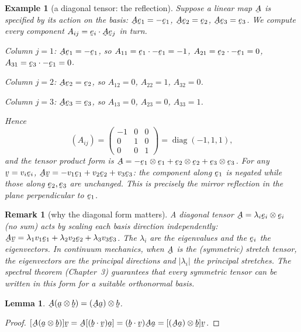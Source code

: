 \documentclass[17pt,a4paper]{extreport}
\DeclareRobustCommand{\vek}[1]{\underaccent{\tilde}{#1}}
\newcommand{\ba}{\vek{a}}
\newcommand{\bb}{\vek{b}}
\newcommand{\bv}{\vek{v}}
\newcommand{\be}{\vek{e}}
\newcommand{\bA}{\vek{A}}
\newcommand{\ip}[2]{#1\cdot#2}
\theoremstyle{scplain}
\newtheorem{lemma}[theorem]{Lemma}
\theoremstyle{scdefn}
\newtheorem{remark}[theorem]{Remark}
\newtheorem{example}[theorem]{Example}
\theoremstyle{scplain}
\begin{document}
\begin{example}[a diagonal tensor: the reflection]\label{ex:diag}
Suppose a linear map $\bA$ is specified by its action on the basis:
$\bA\be_{1}=-\be_{1}$, $\bA\be_{2}=\be_{2}$, $\bA\be_{3}=\be_{3}$.
We compute every component $A_{ij}=\ip{\be_{i}}{\bA\be_{j}}$ in turn.

\emph{Column $j=1$}: $\bA\be_{1}=-\be_{1}$, so
$A_{11}=\ip{\be_{1}}{-\be_{1}}=-1$,
$A_{21}=\ip{\be_{2}}{-\be_{1}}=0$,
$A_{31}=\ip{\be_{3}}{-\be_{1}}=0$.

\emph{Column $j=2$}: $\bA\be_{2}=\be_{2}$, so
$A_{12}=0$, $A_{22}=1$, $A_{32}=0$.

\emph{Column $j=3$}: $\bA\be_{3}=\be_{3}$, so
$A_{13}=0$, $A_{23}=0$, $A_{33}=1$.

Hence
\[
(A_{ij})=\begin{pmatrix}-1&0&0\\0&1&0\\0&0&1\end{pmatrix}
=\operatorname{diag}(-1,1,1),
\]
and the tensor product form is
$\bA=-\be_{1}\otimes\be_{1}+\be_{2}\otimes\be_{2}+\be_{3}\otimes\be_{3}$.
For any $\bv=v_i\be_i$,
$\bA\bv=-v_1\be_1+v_2\be_2+v_3\be_3$: the component along $\be_1$ is
negated while those along $\be_2,\be_3$ are unchanged. This is precisely
the \emph{mirror reflection} in the plane perpendicular to $\be_1$.
\end{example}

\begin{remark}[why the diagonal form matters]\label{rem:diag}
A diagonal tensor $\bA=\lambda_i\be_i\otimes\be_i$ (no sum) acts by
scaling each basis direction independently:
$\bA\bv=\lambda_1v_1\be_1+\lambda_2v_2\be_2+\lambda_3v_3\be_3$. The
$\lambda_i$ are the eigenvalues and the $\be_i$ the eigenvectors. In
continuum mechanics, when $\bA$ is the (symmetric) stretch tensor, the
eigenvectors are the principal directions and $|\lambda_i|$ the principal
stretches. The spectral theorem (Chapter~3) guarantees that every
symmetric tensor can be written in this form for a suitable orthonormal
basis.
\end{remark}

\begin{lemma}\label{lem:Aab}
$\bA(\ba\otimes\bb)=(\bA\ba)\otimes\bb$.
\end{lemma}

\begin{proof}
$[\bA(\ba\otimes\bb)]\bv=\bA[(\ip\bb\bv)\ba]=(\ip\bb\bv)\bA\ba
=[(\bA\ba)\otimes\bb]\bv$.
\end{proof}
\end{document}
